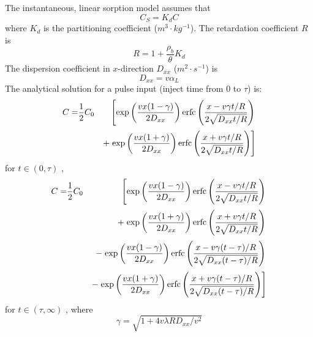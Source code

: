 The instantaneous, linear sorption model assumes that
\begin{equation}\label{colloid sorption model}
C_S = K_{d} C
\end{equation}
where $K_{d}$ is the partitioning coefficient ($m^3 \cdot kg^{-1}$). The retardation coefficient $R$ is
\begin{equation}\label{colloid retardation coefficient}
R = 1 + \frac{\rho_b}{\theta} K_{d}
\end{equation}
The dispersion coefficient in $x$-direction $D_{xx}$ ($m^2 \cdot s^{-1}$) is
\begin{equation}\label{colloid dispersion x}
D_{xx} = v \alpha_L
\end{equation}
The analytical solution for a pulse input (inject time from 0 to $\tau$) is:
\begin{eqnarray}\label{colloid analytical 1}
C = & \frac{1}{2} C_0 &
\mbox{\hspace{-1.5ex}}\mbox{\hspace{-1.5ex}}
\left[
\exp
\left(
\frac{v x(1-\gamma)}{2 D_{xx}}
\right)
\mathrm{erfc}
\left(
\frac{x-v\gamma t/R}{2 \sqrt{D_{xx} t/R}}
\right)
\right. \nonumber\\[0.5ex]
& &
+\left.
\exp
\left(
\frac{v x(1+\gamma)}{2 D_{xx}}
\right)
\mathrm{erfc}
\left(
\frac{x+v\gamma t/R}{2 \sqrt{D_{xx} t/R}}
\right)
\right]
\end{eqnarray}
{\small
for $t \in (0, \tau) $ ,
}
\begin{eqnarray}\label{colloid analytical 2}
C = & \frac{1}{2} C_0 &
\mbox{\hspace{-1.5ex}} \mbox{\hspace{-1.5ex}}
\left[
\exp
\left(
\frac{v x(1-\gamma)}{2 D_{xx}}
\right)
\mathrm{erfc}
\left(
\frac{x-v \gamma t/R}{2 \sqrt{D_{xx} t/R}}
\right)
\right. \nonumber\\[0.5ex]
& &
+\left.
\exp
\left(
\frac{v x(1+\gamma)}{2 D_{xx}}
\right)
\mathrm{erfc}
\left(
\frac{x + v \gamma t/R}{2 \sqrt{D_{xx} t/R}}
\right)
\right. \nonumber\\[0.5ex]
& &
-\left.
\exp
\left(
\frac{v x(1-\gamma)}{2 D_{xx}}
\right)
\mathrm{erfc}
\left(
\frac{x - v\gamma (t - \tau)/R}{2 \sqrt{D_{xx} (t - \tau)/R}}
\right)
\right. \nonumber\\[0.5ex]
& &
-\left.
\exp
\left(
\frac{v x(1+\gamma)}{2 D_{xx}}
\right)
\mathrm{erfc}
\left(
\frac{x + v \gamma (t - \tau)/R}{2 \sqrt{D_{xx} (t - \tau)/R}}
\right)
\right]
\end{eqnarray}
{\small
for $t \in (\tau, \infty) $ , where
}
\begin{equation}\label{colloid analytical 3}
\gamma = \sqrt{1 + 4  v  \lambda  R  D_{xx} / v^2}
\end{equation}


